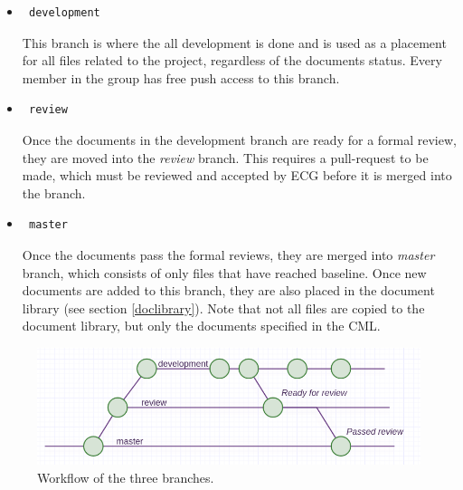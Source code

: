 \documentclass{article}
\begin{document}
            \begin{itemize}
                \item \begin{verbatim} development \end{verbatim}
                This branch is where the all development is done and is used as a placement for all files related
                to the project, regardless of the documents status.
                Every member in the group has free push access to this branch.
                
                \item \begin{verbatim} review \end{verbatim}
                Once the documents in the development branch are ready for a formal review,  they are moved
                into the \textit{review} branch. This requires a pull-request to be made, which must be reviewed and accepted by ECG before it is merged into the branch. 
                
                \item \begin{verbatim} master \end{verbatim}
                Once the documents pass the formal reviews, they are merged into 
                \textit{master} branch, which consists of only files that have reached baseline.
                Once new documents are added to this branch, they are also placed in the document library (see section \ref{doclibrary}).
                Note that not all files are copied to the document library, but only the documents specified in the CML.
                
            \end{itemize}
            
            \begin{figure}[h]
                \centering
                \includegraphics[width=\textwidth]{images/workflow.png}
                \caption{Workflow of the three branches.}
                \label{workflow}
            \end{figure}
        
\end{document}
